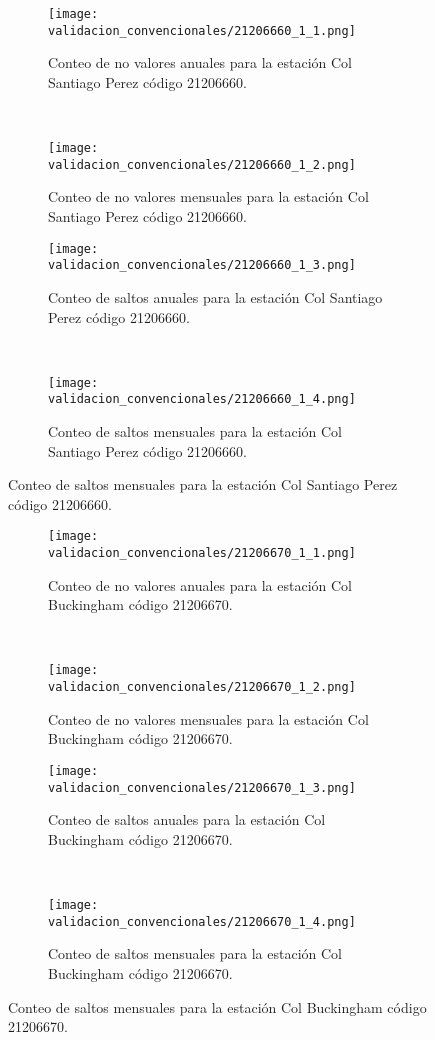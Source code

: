 \begin{figure}[H]\ContinuedFloat
\centering
	\begin{subfigure}[normla]{0.4\textwidth}
	\texttt{[image: validacion\_convencionales/21206660\_1\_1.png]}
		\caption{Conteo de no valores anuales para la estación Col Santiago Perez código 21206660.}
		\label{subfig:a1}
		\end{subfigure}
		~
    \begin{subfigure}[normla]{0.4\textwidth}
	\texttt{[image: validacion\_convencionales/21206660\_1\_2.png]}
		\caption{Conteo de no valores mensuales para la estación Col Santiago Perez código 21206660.}
		\label{subfig:a2}
		\end{subfigure}
		
    \begin{subfigure}[normla]{0.4\textwidth}
	\texttt{[image: validacion\_convencionales/21206660\_1\_3.png]}
		\caption{Conteo de saltos anuales para la estación Col Santiago Perez código 21206660.}
		\label{subfig:a1}
		\end{subfigure}
		~
    \begin{subfigure}[normla]{0.4\textwidth}
	\texttt{[image: validacion\_convencionales/21206660\_1\_4.png]}
		\caption{Conteo de saltos mensuales para la estación Col Santiago Perez código 21206660.}
		\label{subfig:a2}
		\end{subfigure}

	
\end{figure}
           
\begin{figure}[H]\ContinuedFloat
\centering
	\begin{subfigure}[normla]{0.4\textwidth}
	\texttt{[image: validacion\_convencionales/21206670\_1\_1.png]}
		\caption{Conteo de no valores anuales para la estación Col Buckingham código 21206670.}
		\label{subfig:a1}
		\end{subfigure}
		~
    \begin{subfigure}[normla]{0.4\textwidth}
	\texttt{[image: validacion\_convencionales/21206670\_1\_2.png]}
		\caption{Conteo de no valores mensuales para la estación Col Buckingham código 21206670.}
		\label{subfig:a2}
		\end{subfigure}
		
    \begin{subfigure}[normla]{0.4\textwidth}
	\texttt{[image: validacion\_convencionales/21206670\_1\_3.png]}
		\caption{Conteo de saltos anuales para la estación Col Buckingham código 21206670.}
		\label{subfig:a1}
		\end{subfigure}
		~
    \begin{subfigure}[normla]{0.4\textwidth}
	\texttt{[image: validacion\_convencionales/21206670\_1\_4.png]}
		\caption{Conteo de saltos mensuales para la estación Col Buckingham código 21206670.}
		\label{subfig:a2}
		\end{subfigure}

	
\end{figure}
           

